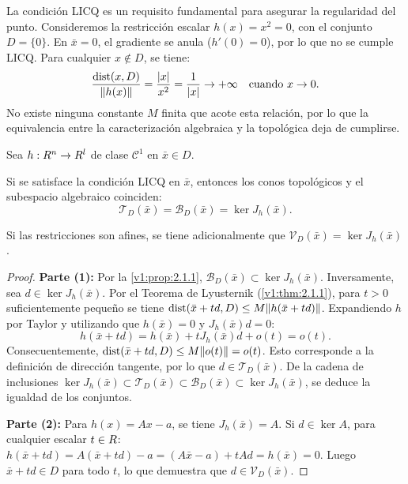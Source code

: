 \begin{warningbox}
 La condición LICQ es un requisito fundamental para asegurar la regularidad del punto. Consideremos la restricción escalar $h(x) = x^2 = 0$, con el conjunto $D = \{0\}$. En $\bar{x} = 0$, el gradiente se anula ($h'(0) = 0$), por lo que no se cumple LICQ. Para cualquier $x \notin D$, se tiene:
 \[
 \frac{\operatorname{dist}(x, D)}{\lVert h(x)\rVert} = \frac{\lvert x\rvert}{x^2} = \frac{1}{\lvert x\rvert} \to +\infty \quad \text{cuando } x \to 0.
 \]
 No existe ninguna constante $M$ finita que acote esta relación, por lo que la equivalencia entre la caracterización algebraica y la topológica deja de cumplirse.
\end{warningbox}

\begin{theorem}\label{v1:thm:2.1.2}
	Sea $h : R^n \to R^l$ de clase $\mathcal{C}^1$ en $\bar{x} \in D$.
	\begin{enuthm}
		\item Si se satisface la condición LICQ en $\bar{x}$, entonces los conos topológicos y el subespacio algebraico coinciden:
		\[
			\mathcal{T}_D(\bar{x}) = \mathcal{B}_D(\bar{x}) = \ker J_h(\bar{x}).
		\]
		\item Si las restricciones son afines, se tiene adicionalmente que $\mathcal{V}_D(\bar{x}) = \ker J_h(\bar{x})$.
	\end{enuthm}
\end{theorem}

\begin{proof}
 \textbf{Parte (1):} Por la \cref{v1:prop:2.1.1}, $\mathcal{B}_D(\bar{x}) \subset \ker J_h(\bar{x})$. Inversamente, sea $d \in \ker J_h(\bar{x})$. Por el Teorema de Lyusternik (\cref{v1:thm:2.1.1}), para $t > 0$ suficientemente pequeño se tiene $\operatorname{dist}(\bar{x} + td, D) \le M \lVert h(\bar{x} + td)\rVert$. Expandiendo $h$ por Taylor y utilizando que $h(\bar{x}) = 0$ y $J_h(\bar{x})d = 0$:
	\[
		h(\bar{x} + td) = h(\bar{x}) + t J_h(\bar{x})d + o(t) = o(t).
	\]
 Consecuentemente, $\operatorname{dist}(\bar{x} + td, D) \le M \lVert o(t)\rVert = o(t)$. Esto corresponde a la definición de dirección tangente, por lo que $d \in \mathcal{T}_D(\bar{x})$. De la cadena de inclusiones $\ker J_h(\bar{x}) \subset \mathcal{T}_D(\bar{x}) \subset \mathcal{B}_D(\bar{x}) \subset \ker J_h(\bar{x})$, se deduce la igualdad de los conjuntos.

 \textbf{Parte (2):} Para $h(x) = Ax - a$, se tiene $J_h(\bar{x}) = A$. Si $d \in \ker A$, para cualquier escalar $t \in R$: $h(\bar{x} + td) = A(\bar{x} + td) - a = (A\bar{x} - a) + tAd = h(\bar{x}) = 0$. Luego $\bar{x} + td \in D$ para todo $t$, lo que demuestra que $d \in \mathcal{V}_D(\bar{x})$.
\end{proof}

